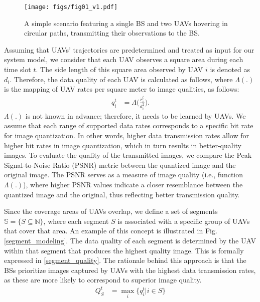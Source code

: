 \documentclass[conference]{IEEEtran}
\begin{document}
\begin{figure}[!t]
    \centerline{\texttt{[image: figs/fig01\_v1.pdf]}}
    \caption{A simple scenario featuring a single BS and two UAVs hovering in circular paths, transmitting their observations to the BS.}
    \vspace{-10pt}
    \label{fig1}
\end{figure}

Assuming that UAVs' trajectories are predetermined and treated as input for our system model, we consider that each UAV observes a square area during each time slot \(t\). The side length of this square area observed by UAV \(i\) is denoted as \(d_{i}\). Therefore, the data quality of each UAV is calculated as follows, where $\Lambda(.)$ is the mapping of UAV rates per square meter to image qualities, as follows:
\begin{align}\label{quality}
    q_{i}^{t} &= \Lambda\Big( \frac{\dot{r}_{i}^{t}}{{d}_{i}^{2}} \Big).
\end{align}
\(\Lambda(.)\) is not known in advance; therefore, it needs to be learned by UAVs. We assume that each range of supported data rates corresponds to a specific bit rate for image quantization. In other words, higher data transmission rates allow for higher bit rates in image quantization, which in turn results in better-quality images. To evaluate the quality of the transmitted images, we compare the Peak Signal-to-Noise Ratio (PSNR) metric between the quantized image and the original image. The PSNR serves as a measure of image quality (i.e., function $\Lambda(.)$), where higher PSNR values indicate a closer resemblance between the quantized image and the original, thus reflecting better transmission quality.

Since the coverage areas of UAVs overlap, we define a set of segments \(\mathbb{S} = \{ S \subseteq \mathbb{N} \}\), where each segment \(S\) is associated with a specific group of UAVs that cover that area. An example of this concept is illustrated in Fig. \ref{segment_modeling}. The data quality of each segment is determined by the UAV within that segment that produces the highest quality image. This is formally expressed in \eqref{segment_quality}. The rationale behind this approach is that the BSs prioritize images captured by UAVs with the highest data transmission rates, as these are more likely to correspond to superior image quality.
\begin{align}\label{segment_quality}
    {Q}_{S}^{t} &= \max_{i}\Big\{ q_{i}^{t} | i \in S \Big\}
\end{align}
\end{document}

